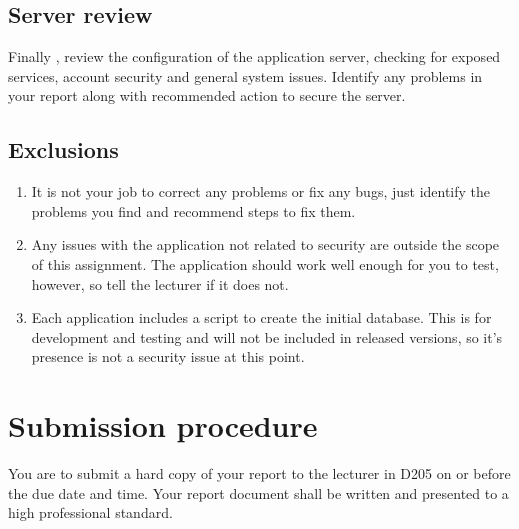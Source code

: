 \documentclass{article}
\begin{document}
\subsection*{Server review}
Finally , review the configuration of the application server, checking for exposed services, account security and general system issues. Identify any problems in your report along with recommended action to secure the server.

\subsection*{Exclusions}
\begin{enumerate}
	\item It is not your job to correct any problems or fix any bugs, just identify the problems you find and recommend steps to fix them.
	\item Any issues with the application not related to security are outside the scope of this assignment. The application should work well enough for you to test, however, so tell the lecturer if it does not.
	\item Each application includes a script to create the initial database. This is for development and testing and will not be included in released versions, so it's presence is not a security issue at this point.
\end{enumerate}

\section*{Submission procedure}
You are to submit a hard copy of your report to the lecturer in D205 on or before the due date and time. Your report document shall be written and presented to a high professional standard.
\end{document}
